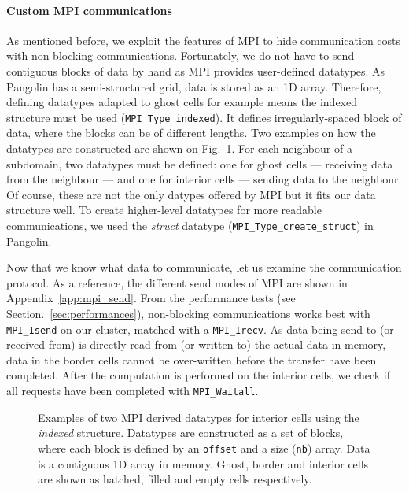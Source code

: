 \paragraph{Custom MPI communications}
As mentioned before, we exploit the features of \gls{MPI} to hide 
communication costs with non-blocking communications. Fortunately, we do not have
to send contiguous blocks of data by hand as MPI provides user-defined
datatypes. As Pangolin has a semi-structured grid, data is stored as an 1D array.
Therefore, defining datatypes adapted to ghost cells for example means the
indexed structure must be used (\texttt{MPI\_Type\_indexed}). It defines 
irregularly-spaced block of data, where the blocks can be of different
lengths.
Two examples on how the datatypes are constructed are shown on
Fig.~\ref{fig:datatypes}. For each neighbour of a subdomain, two datatypes must be
defined: one for ghost cells --- receiving data from the neighbour --- and one
for interior cells --- sending data to the neighbour. Of course, these are not
the only datypes offered by MPI but it fits our data structure well.  To create
higher-level datatypes for more readable communications, we used the
\textit{struct} datatype (\texttt{MPI\_Type\_create\_struct}) in Pangolin.

Now that we know what data to communicate, let us examine the communication
protocol. As a reference, the different send modes of MPI are shown in
Appendix~\ref{app:mpi_send}. From the performance tests (see 
Section.~\ref{sec:performances}), non-blocking communications works best with
\texttt{MPI\_Isend} on our cluster, matched with a \texttt{MPI\_Irecv}. As data
being send to (or received from) is directly read from (or written to) the
actual data in memory, data in the border cells cannot be over-written before the
transfer have been completed. After the computation is performed on the interior
cells, we check if all requests have been completed with \texttt{MPI\_Waitall}.

\begin{figure}
  \hfill
  \caption{Examples of two MPI derived datatypes for interior cells using the
    \textit{indexed} structure. Datatypes are constructed as a set of blocks, where
    each block is defined by an \texttt{offset} and a size (\texttt{nb}) array. Data
    is a contiguous 1D array in memory. Ghost, border and interior cells are
  shown as hatched, filled and empty cells respectively.}
\label{fig:datatypes}
\end{figure}

